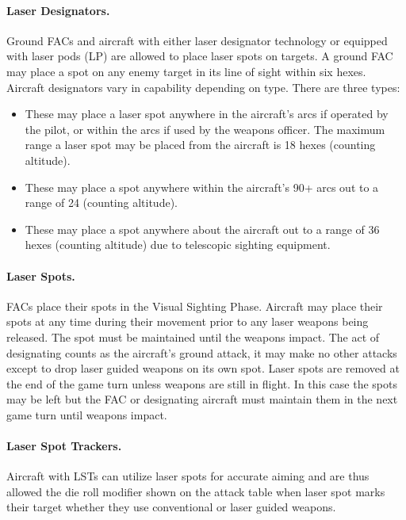 \paragraph{Laser Designators.} Ground FACs and aircraft with either laser designator technology or equipped with laser pods (LP) are allowed to place laser spots on targets. A ground FAC may place a spot on any enemy target in its line of sight within six hexes. Aircraft designators vary in capability depending on type. There are three types:

\begin{itemize}

    \item{} These may place a laser spot anywhere in the aircraft's  arcs if operated by the pilot, or within the  arcs if used by the weapons officer. The maximum range a laser spot may be placed from the aircraft is 18 hexes (counting altitude).

    \item{} These may place a spot anywhere within the aircraft's 90+ arcs out to a range of 24 (counting altitude).

    \item{} These may place a spot anywhere about the aircraft out to a range of 36 hexes (counting altitude) due to telescopic sighting equipment.

\end{itemize}


\paragraph{Laser Spots.} 
\label{rule:laser-spots}
FACs place their spots in the Visual Sighting Phase. Aircraft may place their spots at any time during their movement prior to any laser weapons being released. The spot must be maintained until the weapons impact. The act of designating counts as the aircraft's ground attack, it may make no other attacks except to drop laser guided weapons on its own spot. Laser spots are removed at the end of the game turn unless weapons are still in flight. In this case the spots may be left but the FAC or designating aircraft must maintain them in the next game turn until weapons impact.

\paragraph{Laser Spot Trackers.} Aircraft with LSTs can utilize laser spots for accurate aiming and are thus allowed the die roll modifier shown on the attack table when laser spot marks their target whether they use conventional or laser guided weapons.  

